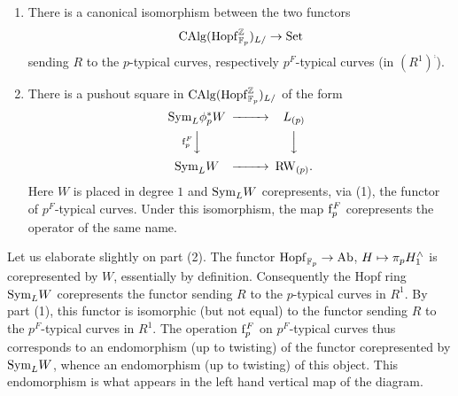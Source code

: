 \begin{theorem} \label{thm:alternative-presentation}
\begin{enumerate}
\item There is a canonical isomorphism between the two functors \[ \mathrm{CAlg}(\mathrm{Hopf}_{\mathbb{F}_p}^{\mathbb{Z}})_{L/} \to \mathrm{Set} \] sending $R$ to the $p$-typical curves, respectively $p^F$-typical curves (in $(R^1)^\comp$).
\item There is a pushout square in $\mathrm{CAlg}(\mathrm{Hopf}_{\mathbb{F}_p}^{\mathbb{Z}})_{L/}$ of the form
\begin{equation*}
\begin{CD}
\Sym_L \phi_p^* W @>>> L_{(p)} \\
  @V\frob_p^FVV        @VVV \\
\Sym_L W @>>> \RW_{(p)}.
\end{CD}
\end{equation*}
  Here $W$ is placed in degree $1$ and $\mathrm{Sym}_L W$ corepresents, via (1), the functor of $p^F$-typical curves.
  Under this isomorphism, the map $\mathrm f_p^F$ corepresents the operator of the same name.
\end{enumerate}
\end{theorem}
Let us elaborate slightly on part (2).
The functor $\mathrm{Hopf}_{\mathbb{F}_p} \to \mathrm{Ab}$, $H \mapsto \mathrm \pi_p H^\wedge_1$ is corepresented by $W$, essentially by definition.
Consequently the Hopf ring $\mathrm{Sym}_L W$ corepresents the functor sending $R$ to the $p$-typical curves in $R^1$.
By part (1), this functor is isomorphic (but not equal) to the functor sending $R$ to the $p^F$-typical curves in $R^1$.
The operation $\mathrm f_p^F$ on $p^F$-typical curves thus corresponds to an endomorphism (up to twisting) of the functor corepresented by $\mathrm{Sym}_L W$, whence an endomorphism (up to twisting) of this object.
This endomorphism is what appears in the left hand vertical map of the diagram.
